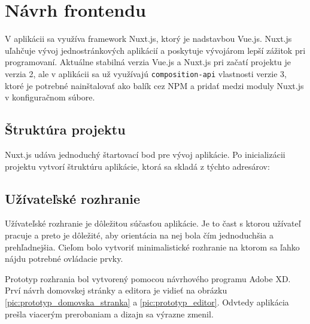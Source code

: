 \section{Návrh frontendu}
V aplikácii sa využíva framework Nuxt.js, ktorý je nadstavbou Vue.js. Nuxt.js uľahčuje vývoj jednostránkových aplikácií a poskytuje vývojárom lepší zážitok pri programovaní. 
Aktuálne stabilná verzia Vue.js a Nuxt.js pri začatí projektu je verzia 2, ale v aplikácii sa už využívajú \texttt{composition-api} vlastnosti verzie 3, ktoré je potrebné nainštalovať ako balík cez NPM a pridať medzi moduly Nuxt.js v konfiguračnom súbore.

\subsection{Štruktúra projektu}
Nuxt.js udáva jednoduchý štartovací bod pre vývoj aplikácie. Po inicializácii projektu vytvorí štruktúru aplikácie, ktorá sa skladá z týchto adresárov:

\subsection{Užívateľské rozhranie}
Užívateľské rozhranie je dôležitou súčasťou aplikácie. Je to čast s ktorou užívateľ pracuje a preto je dôležité, aby orientácia na nej bola čím jednoduchšia a prehľadnejšia. Cieľom bolo vytvoriť minimalistické rozhranie na ktorom sa ľahko nájdu potrebné ovládacie prvky.

Prototyp rozhrania bol vytvorený pomocou návrhového programu Adobe XD. Prví návrh domovskej stránky a editora je vidieť na obrázku \ref{pic:prototyp_domovska_stranka} a \ref{pic:prototyp_editor}. Odvtedy aplikácia prešla viacerým prerobaniam a dizajn sa výrazne zmenil.

